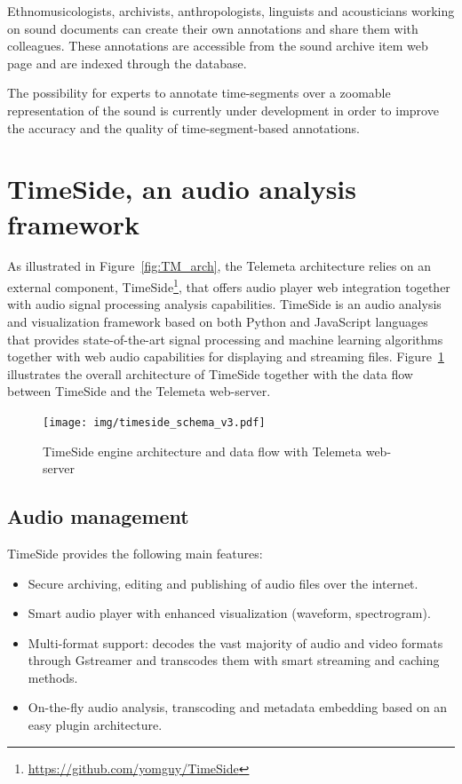 \documentclass{sig-alternate}
\begin{document}
Ethnomusicologists, archivists, anthropologists, linguists and acousticians working on sound documents can create their own annotations and share them with colleagues. These annotations are accessible from the sound archive item web page and are indexed through the database.

The possibility for experts to annotate time-segments over a zoomable representation of the sound is currently under development in order to improve the accuracy and the quality of time-segment-based annotations.


\section{TimeSide, an audio analysis framework}\label{sec:TimeSide}
As illustrated in Figure~\ref{fig:TM_arch}, the Telemeta architecture relies on an external component, TimeSide\footnote{\url{https://github.com/yomguy/TimeSide}}, that offers audio player web integration together with audio signal processing analysis capabilities. 
TimeSide is an audio analysis and visualization framework based on both Python and JavaScript languages that provides state-of-the-art signal processing and machine learning algorithms together with web audio capabilities for displaying and streaming files.
Figure~\ref{fig:TimeSide_Archi} illustrates the overall architecture of TimeSide together with the data flow between TimeSide and the Telemeta web-server.
\begin{figure}[htbp]
  \centering
  \texttt{[image: img/timeside\_schema\_v3.pdf]}
  \caption{TimeSide engine architecture and data flow with Telemeta web-server}\label{fig:TimeSide_Archi}
\end{figure}

\subsection{Audio management}
TimeSide provides the following main features:
\begin{itemize}
\item Secure archiving, editing and publishing of audio files over
  the internet.
\item Smart audio player with enhanced visualization (waveform, spectrogram).
\item Multi-format support: decodes the vast majority of audio and video formats through Gstreamer and transcodes them with smart streaming and caching methods.
\item On-the-fly audio analysis, transcoding and metadata embedding based on an easy plugin architecture.
\end{itemize}
\end{document}
